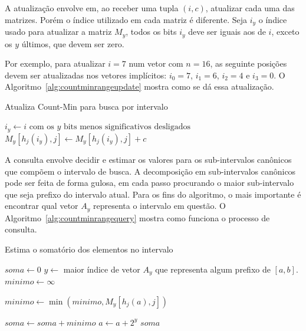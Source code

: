 A atualização envolve em, ao receber uma tupla $(i, c)$, atualizar cada uma das matrizes. Porém o índice utilizado em cada matriz é diferente. Seja $i_y$ o índice usado para atualizar a matriz $M_y$, todos os bits $i_y$ deve ser iguais aos de $i$, exceto os $y$ últimos, que devem ser zero.

Por exemplo, para atualizar $i=7$ num vetor com $n=16$, as seguinte posições devem ser atualizadas nos vetores implícitos: $i_0 = 7$, $i_1=6$, $i_2=4$ e $i_3=0$. O Algoritmo~\ref{alg:countminrangeupdate} mostra como se dá essa atualização.

\begin{algorithm}
\linespread{1}\selectfont
\caption{Atualiza Count-Min para busca por intervalo}
\label{alg:countminrangeupdate}
\begin{algorithmic}[1]
        \State $i_y \gets i \textrm{ com os } y \textrm{ bits menos significativos desligados}$
            \State $M_y[h_j(i_y), j] \gets M_y[h_j(i_y), j] + c$
    	\EndFor
	\EndFor
\EndProcedure
\end{algorithmic}
\end{algorithm}

A consulta envolve decidir e estimar os valores para os sub-intervalos canônicos que compõem o intervalo de busca. A decomposição em sub-intervalos canônicos pode ser feita de forma gulosa, em cada passo procurando o maior sub-intervalo que seja prefixo do intervalo atual. Para os fins do algoritmo, o mais importante é encontrar qual vetor $A_y$ representa o intervalo em questão. O Algoritmo~\ref{alg:countminrangequery} mostra como funciona o processo de consulta.

\begin{algorithm}
\linespread{1}\selectfont
\caption{Estima o somatório dos elementos no intervalo}
\label{alg:countminrangequery}
\begin{algorithmic}[1]
    \State $soma \gets 0$
        \State $y \gets $ maior índice de vetor $A_y$ que representa algum prefixo de $[a, b]$.
        \State $minimo \gets \infty$
        
            \State $minimo \gets \min(minimo, M_y[h_j(a), j])$
    	\EndFor
    	
    	\State $soma \gets soma + minimo$
    	\State $a \gets a + 2^y$
    \EndWhile
    \Return $soma$
\EndFunction
\end{algorithmic}
\end{algorithm}

